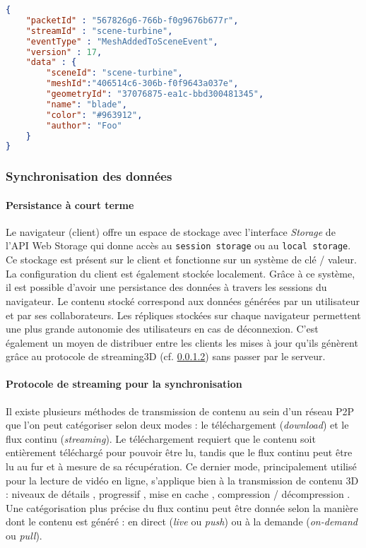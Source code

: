 \begin{lstlisting}[language=json,firstnumber=1,label=jsonstore,caption=Format
du Message transitant sur le réseau contenant l'événement MeshAddedToScene 
et ses 
paramètres]
{
	"packetId" : "567826g6-766b-f0g9676b677r",
	"streamId" : "scene-turbine",
	"eventType" : "MeshAddedToSceneEvent",
	"version" : 17,
	"data" : {
		"sceneId": "scene-turbine",
		"meshId":"406514c6-306b-f0f9643a037e",
		"geometryId": "37076875-ea1c-bbd300481345",
		"name": "blade",
		"color": "#963912",
		"author": "Foo"
	}
}
\end{lstlisting}


\subsubsection{Synchronisation des données}
\paragraph{Persistance à court terme}
Le navigateur (client) offre un espace de stockage avec l'interface \textit{Storage} 
de l'API Web Storage qui donne accès au \texttt{session storage} ou au  
\texttt{local storage}. Ce stockage est présent sur le client et fonctionne sur un 
système de clé / valeur. La configuration du client est également 
stockée localement. Grâce à ce système, il est possible d'avoir une 
persistance des données à travers les sessions du navigateur. Le contenu stocké 
correspond aux données générées par un utilisateur et par ses collaborateurs. Les 
répliques stockées sur chaque navigateur permettent une plus 
grande 
autonomie des utilisateurs en cas de déconnexion. C'est également un moyen de distribuer entre 
les clients les 
mises à jour qu'ils génèrent grâce au protocole de 
\gls{streaming3D} (cf. \ref{streamingprotocol}) sans passer par le serveur.

\paragraph{Protocole de streaming pour la synchronisation}
\label{streamingprotocol}

Il existe plusieurs méthodes de transmission de contenu au sein d'un réseau 
\gls{P2P} que l'on peut catégoriser selon deux modes : le téléchargement 
(\textit{download}) 
et le flux continu (\textit{streaming}). Le téléchargement requiert que le contenu 
soit entièrement téléchargé pour pouvoir être lu, tandis que le flux continu peut 
être lu au fur et à mesure de sa récupération. Ce dernier mode, principalement 
utilisé pour la lecture de vidéo en ligne, s'applique bien à la transmission de 
contenu \gls{3D} : niveaux de détails \cite{Chu2012,Hu2008}, progressif 
\cite{Cheng2009,Limper2014}, mise en cache \cite{Jia2014}, compression / 
décompression
\cite{Lavoue2013,Ponchio2015,Maglo2013a}. 
Une catégorisation plus précise du flux continu peut être donnée selon la manière 
dont le contenu est généré : en direct (\textit{live} ou \textit{push}) ou à la demande 
(\textit{on-demand} ou \textit{pull}).  

